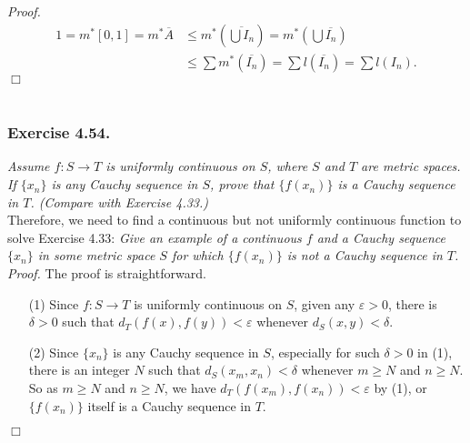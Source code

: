 \documentclass{article}
\begin{document}
\emph{Proof.}
\begin{align*}
1
= m^{*}[0, 1]
= m^{*}\overline{A}
&\leq m^{*}\left( \overline{\bigcup I_n} \right)
= m^{*}\left( \bigcup \overline{I_n} \right) \\
&\leq \sum m^{*}(\overline{I_n})
= \sum l(\overline{I_n})
= \sum l(I_n).
\end{align*}
$\Box$ \\\\






\subsubsection*{Exercise 4.54.}
\emph{Assume $f: S \rightarrow T$ is uniformly continuous on $S$,
where $S$ and $T$ are metric spaces.
If $\{x_n\}$ is any Cauchy sequence in $S$,
prove that $\{f(x_n)\}$ is a Cauchy sequence in $T$.
(Compare with Exercise 4.33.)} \\

Therefore, we need to find a continuous but not uniformly continuous function
to solve Exercise 4.33:
\emph{Give an example of a continuous $f$ and a Cauchy sequence $\{x_n\}$
in some metric space $S$ for which $\{f(x_n)\}$ is not a Cauchy sequence in $T$.} \\

\emph{Proof.}
The proof is straightforward.
\begin{enumerate}
\item[(1)]
Since $f: S \rightarrow T$ is uniformly continuous on $S$,
given any $\varepsilon > 0$, there is $\delta > 0$ such that
$d_T(f(x), f(y)) < \varepsilon$ whenever $d_S(x, y) < \delta$.
\item[(2)]
Since $\{x_n\}$ is any Cauchy sequence in $S$,
especially for such $\delta > 0$ in (1), there is an integer $N$ such that
$d_S(x_m, x_n) < \delta$ whenever $m \geq N$ and $n \geq N$.
So as $m \geq N$ and $n \geq N$, we have
$d_T(f(x_m), f(x_n)) < \varepsilon$ by (1),
or $\{f(x_n)\}$ itself is a Cauchy sequence in $T$.
\end{enumerate}
$\Box$ \\\\



\end{document}
